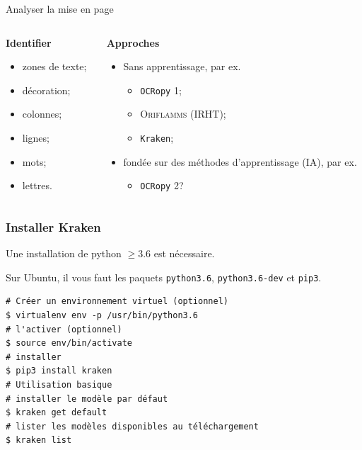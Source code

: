 \documentclass[10pt, compress,urlcolor=blue]{beamer}
\begin{document}
\begin{frame}{Analyser la mise en page}
    \begin{columns}
	\begin{column}{0.45\textwidth}
		\textbf{Identifier}
		\begin{itemize}
		    \item zones de texte;
		    \item décoration;
		    \item colonnes;
		    \item lignes;
		    \item mots;
		    \item lettres.
		\end{itemize}
	\end{column}
	\begin{column}{0.45\textwidth}
		\textbf{Approches}
		\begin{itemize}
		    \item Sans apprentissage, par ex.
		    \begin{itemize}
		        \item \texttt{OCRopy} 1;
		        \item \textsc{Oriflamms} (\textsc{IRHT});
		        \item \texttt{Kraken};
		    \end{itemize}
		    \item fondée sur des méthodes d'apprentissage (IA), par ex.
		    \begin{itemize}
		        \item \texttt{OCRopy} 2?
		    \end{itemize}
 		\end{itemize}
	\end{column}
\end{columns}
    
\end{frame}


\begin{frame}[fragile]
\frametitle{Installer Kraken}

\alert{Une installation de python $\geq 3.6$ est nécessaire.}

Sur Ubuntu, il vous faut les paquets \texttt{python3.6},  \texttt{python3.6-dev} et \texttt{pip3}.

\begin{verbatim}
# Créer un environnement virtuel (optionnel)
$ virtualenv env -p /usr/bin/python3.6
# l'activer (optionnel)
$ source env/bin/activate
# installer
$ pip3 install kraken
# Utilisation basique
# installer le modèle par défaut
$ kraken get default
# lister les modèles disponibles au téléchargement 
$ kraken list
\end{verbatim}
    
\end{frame}
\end{document}
